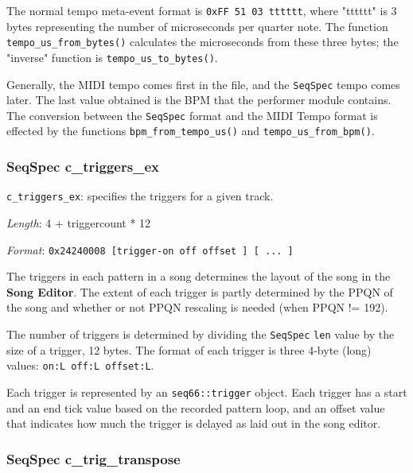    The normal tempo meta-event format is
   \texttt{0xFF 51 03 tttttt}, where "tttttt" is 3 bytes representing the number
   of microseconds per quarter note.
   The function \texttt{tempo\_us\_from\_bytes()} calculates the microseconds
   from these three bytes; the "inverse" function is
   \texttt{tempo\_us\_to\_bytes()}.

   Generally, the MIDI tempo comes first in the file, and the
   \texttt{SeqSpec} tempo comes later.
   The last value obtained is the BPM that the performer module contains.
   The conversion between the
   \texttt{SeqSpec} format and the MIDI Tempo format is
   effected by the functions
   \texttt{bpm\_from\_tempo\_us()} and \texttt{tempo\_us\_from\_bpm()}.

\subsubsection{SeqSpec c\_triggers\_ex}
\label{subsubsec:midi_format_track_seqspec_triggers_ex}


   \begin{description}
      \item \texttt{c\_triggers\_ex}: specifies the triggers for a given track.
      \item \textsl{Length}: 4 + triggercount * 12
      \item \textsl{Format}: \texttt{0x24240008 [trigger-on off offset ] [ ... ]}
   \end{description}

   The triggers in each pattern in a song determines the layout of the song in 
   the \textbf{Song Editor}.
   The extent of each trigger is partly determined by the PPQN of the song and
   whether or not PPQN rescaling is needed (when PPQN != 192).

   The number of triggers is determined by dividing the
   \texttt{SeqSpec} \texttt{len}
   value by the size of a trigger, 12 bytes.
   The format of each trigger is three 4-byte (long)
   values: \texttt{on:L off:L offset:L}.

   Each trigger is represented by an \texttt{seq66::trigger} object.
   Each trigger has a start and an end tick value based on the
   recorded pattern loop, and an offset value that indicates how much
   the trigger is delayed as laid out in the song editor.

\subsubsection{SeqSpec c\_trig\_transpose}
\label{subsubsec:midi_format_track_seqspec_trig_transpose}

